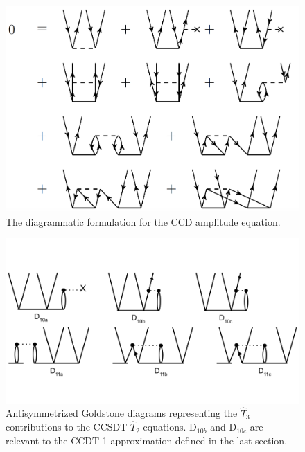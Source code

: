 \begin{figure}
    \centering
    \includegraphics[scale=0.25]{Images/Chapter3/Diagrams-CCD.png}
    \caption{The diagrammatic formulation for the CCD amplitude equation.}
    \label{fig:ccd_amp}
\end{figure}



\begin{figure}
    \centering
    \includegraphics[scale=0.25]{Images/Chapter3/T3 to CCSDT T2.png}
    \caption{Antisymmetrized Goldstone diagrams representing the $\hat{T}_3$ contributions to the CCSDT $\hat{T}_2$ equations. D$_{10b}$ and D$_{10c}$ are relevant to the CCDT-1 approximation defined in the last section.}
    \label{fig:my_label}
\end{figure}

